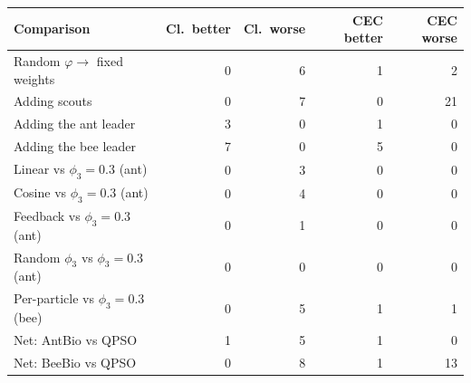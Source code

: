\begin{tabular}{lrrrr}
\toprule
Comparison & Cl.\ better & Cl.\ worse & CEC better & CEC worse \\
\midrule
Random $\varphi\to$ fixed weights & 0 & 6 & 1 & 2 \\
Adding scouts & 0 & 7 & 0 & 21 \\
Adding the ant leader & 3 & 0 & 1 & 0 \\
Adding the bee leader & 7 & 0 & 5 & 0 \\
\midrule
Linear vs $\phi_3=0.3$ (ant) & 0 & 3 & 0 & 0 \\
Cosine vs $\phi_3=0.3$ (ant) & 0 & 4 & 0 & 0 \\
Feedback vs $\phi_3=0.3$ (ant) & 0 & 1 & 0 & 0 \\
Random $\phi_3$ vs $\phi_3=0.3$ (ant) & 0 & 0 & 0 & 0 \\
Per-particle vs $\phi_3=0.3$ (bee) & 0 & 5 & 1 & 1 \\
\midrule
Net: AntBio vs QPSO & 1 & 5 & 1 & 0 \\
Net: BeeBio vs QPSO & 0 & 8 & 1 & 13 \\
\bottomrule
\end{tabular}
